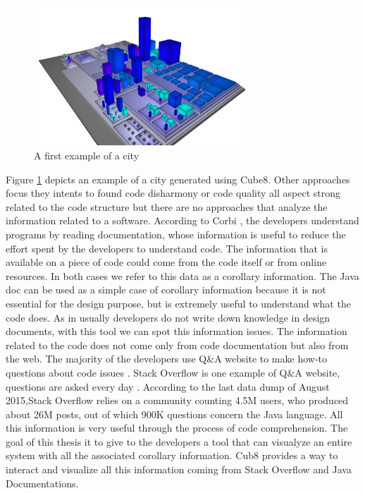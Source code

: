 \documentclass[]{usiinfbachelorproject}
\begin{document}
\begin{figure}[h]
	\centering
\includegraphics[width=8cm]{images/city1}

\caption{A first example of a city\label {fig:myO}}
\end{figure}
Figure \ref{fig:myO} depicts an example of a city generated using Cube8.
Other approaches focus they intents to found code disharmony \cite{programComp} or code quality \cite{VVV} all aspect strong related to the code structure but there are no approaches that analyze the information related to a software. According to Corbi \cite{Corbi}, the developers understand programs by reading documentation, whose information is useful to reduce the effort spent by the developers to understand code.
The information that is available on a piece of code could come from the code itself or from online resources. In both cases we refer to this data as a corollary information.
The Java doc can be used as a simple case of corollary information because it is not essential for the design purpose, but is extremely useful to understand what the code does. As in \cite{LaToza} usually developers do not write down knowledge in design documents, with this tool we can spot this information issues.
The information related to the code does not come only from code documentation but also from the web.
The majority of the developers use Q\&A website to make  how-to questions about code issues \cite{Treude}. Stack Overflow is one example of Q\&A website,  questions are asked every day \cite{QEA}. According to the last data dump of August 2015,Stack Overflow relies on a community counting 4.5M users, who produced about 26M posts, out of which 900K questions concern the Java language. All this information is very useful through the process of code comprehension.
The goal of this thesis it to give to the developers a tool that can visualyze an entire system with all the associated corollary information. Cub8 provides a way to interact and visualize all this information coming from Stack Overflow and Java Documentations.
\end{document}
